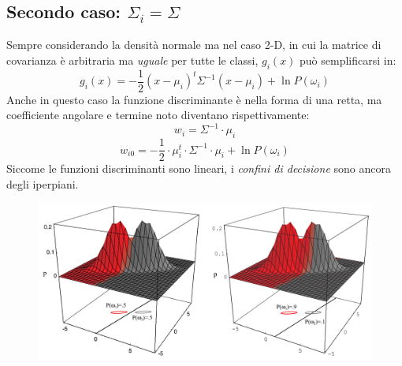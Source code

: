 \documentclass[a4paper,oneside,titlepage]{book}
\begin{document}
\subsection{Secondo caso: \texorpdfstring{$\Sigma_i = \Sigma$}{2-D}}
Sempre considerando la densità normale ma nel caso 2-D, in cui la matrice di covarianza è arbitraria ma \textit{uguale} per tutte le classi, $g_i(x)$ può semplificarsi in:
\[ g_i(x) = - \frac{1}{2} (x - \mu_i)^t \Sigma^{-1} (x - \mu_i) + \ln P(\omega_i) \]
Anche in questo caso la funzione discriminante è nella forma di una retta, ma coefficiente angolare e termine noto diventano rispettivamente:
\[ w_i = \Sigma^{-1} \cdot \mu_i \]
\[ w_{i0} = - \frac{1}{2} \cdot \mu_i^t \cdot \Sigma^{-1} \cdot \mu_i + \ln P(\omega_i) \]
Siccome le funzioni discriminanti sono lineari, i \textit{confini di decisione} sono ancora degli iperpiani.
\begin{figure}[htp]
	\centering
	\includegraphics[width=\textwidth, height=\textheight, keepaspectratio]{2D.png}
\end{figure}
\end{document}
